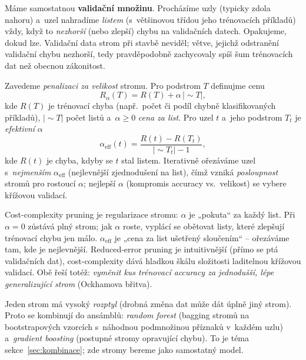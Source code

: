 \begin{definice}
Máme samostatnou \textbf{validační množinu}. Procházíme uzly (typicky zdola nahoru) a~uzel nahradíme \emph{listem} (s~většinovou třídou jeho trénovacích příkladů) vždy, když to \emph{nezhorší} (nebo zlepší) chybu na validačních datech. Opakujeme, dokud lze. Validační data strom při stavbě neviděl; větve, jejichž odstranění validační chybu nezhorší, tedy pravděpodobně zachycovaly spíš šum trénovacích dat než obecnou zákonitost.
\end{definice}

\begin{definice}
Zavedeme \emph{penalizaci za velikost} stromu. Pro podstrom $T$ definujme cenu
\[ R_\alpha(T) = R(T) + \alpha\,|{\sim}T|, \]
kde $R(T)$ je trénovací chyba (např.\ počet či podíl chybně klasifikovaných příkladů), $|{\sim}T|$ počet listů a~$\alpha\ge 0$ \emph{cena za list}. Pro uzel $t$ a~jeho podstrom $T_t$ je \emph{efektivní} $\alpha$
\[ \alpha_{\mathrm{eff}}(t) = \frac{R(t) - R(T_t)}{|{\sim}T_t| - 1}, \]
kde $R(t)$ je chyba, kdyby se $t$ stal listem. Iterativně ořezáváme uzel s~\emph{nejmenším} $\alpha_{\mathrm{eff}}$ (nejlevnější zjednodušení na list), čímž vzniká \emph{posloupnost} stromů pro rostoucí $\alpha$; nejlepší $\alpha$ (kompromis accuracy vs.\ velikost) se vybere křížovou validací.
\end{definice}

\begin{intuice}
Cost-complexity pruning je regularizace stromu: $\alpha$ je „pokuta`` za každý list. Při $\alpha=0$ zůstává plný strom; jak $\alpha$ roste, vyplácí se obětovat listy, které zlepšují trénovací chybu jen málo. $\alpha_{\mathrm{eff}}$ je „cena za list ušetřený sloučením`` -- ořezáváme tam, kde je nejlevnější. Reduced-error pruning je intuitivnější (přímo se ptá validačních dat), cost-complexity dává hladkou škálu složitosti laditelnou křížovou validací. Obě řeší totéž: \emph{vyměnit kus trénovací accuracy za jednodušší, lépe generalizující strom} (Ockhamova břitva).
\end{intuice}

\begin{poznamka}
Jeden strom má vysoký \emph{rozptyl} (drobná změna dat může dát úplně jiný strom). Proto se kombinují do ansámblů: \emph{random forest} (bagging stromů na bootstrapových vzorcích s~náhodnou podmnožinou příznaků v~každém uzlu) a~\emph{gradient boosting} (postupné stromy opravující chybu). To je téma sekce~\ref{sec:kombinace}; zde stromy bereme jako samostatný model.
\end{poznamka}

